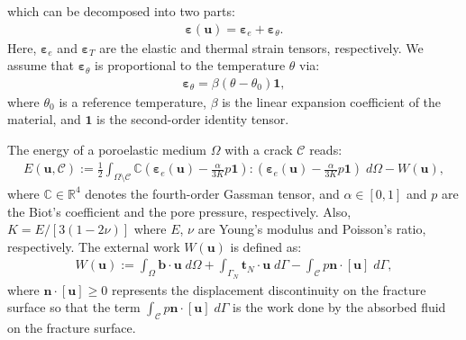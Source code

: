 which can be decomposed into two parts:
\begin{equation}\label{Eq:epsilon_decomp}
\begin{aligned}
	\bm{\varepsilon}(\bm{u}) = \bm{\varepsilon}_e+\bm{\varepsilon}_{\theta}.
\end{aligned}
\end{equation}
Here, $\bm{\varepsilon}_e$ and $\bm{\varepsilon}_{T}$ are the elastic and thermal strain tensors, respectively. We assume that $\bm{\varepsilon}_{\theta}$ is proportional to the temperature $\theta$ via:
\begin{equation}\label{Eq:epsilon_theta}
	\begin{aligned}
		\bm{\varepsilon}_{\theta} = \beta(\theta-\theta_0)\mathbf{1},
	\end{aligned}
	\end{equation}
where $\theta_0$ is a reference temperature, $\beta$ is the linear expansion coefficient of the material, and $\mathbf{1}$ is the {second-order} identity tensor.

The energy of a poroelastic medium $\Omega$ with a crack $\mathcal{C}$ reads:
\begin{equation}\label{Eq:E}
\begin{aligned}
E(\bm{u},\mathcal{C}):= \frac12 \int_{\Omega\setminus\mathcal{C}} \mathbb{C}\left(\bm{\varepsilon}_e(\bm{u})-\frac{\alpha}{3K}p\mathbf{1}\right):\left(\bm{\varepsilon}_e(\bm{u})-\frac{\alpha}{3K}p\mathbf{1}\right)\; d\Omega - W(\bm{u}),
\end{aligned}
\end{equation}
where $\mathbb{C}\in\mathbb{R}^4$ denotes the fourth-order Gassman tensor, and $\alpha\in[0,1]$ and $p$ are the Biot's coefficient and the pore pressure, respectively. Also, $K=E/[3(1-2\nu)]$ where $E$, $\nu$ are Young's modulus and Poisson's ratio, respectively.
The external work $W(\bm{u})$ is defined as:
\begin{equation}\label{Eq:External}
	\begin{aligned}
		W(\bm{u}):=\int_{\Omega} \bm{b} \cdot \bm{u} \; d\Omega+\int_{\Gamma_N} \bm{t}_N\cdot \bm{u} \; d\Gamma - \int_{\mathcal{C}} p\bm{n}\cdot[\bm{u}] \; d\Gamma,
	\end{aligned}
\end{equation}
where $\bm{n}\cdot[\bm{u}]\geq 0$ represents the displacement discontinuity on the fracture surface so that the term $\int_{\mathcal{C}} p\bm{n}\cdot[\bm{u}] \; d\Gamma$
is the work done by the absorbed fluid on the fracture surface.


